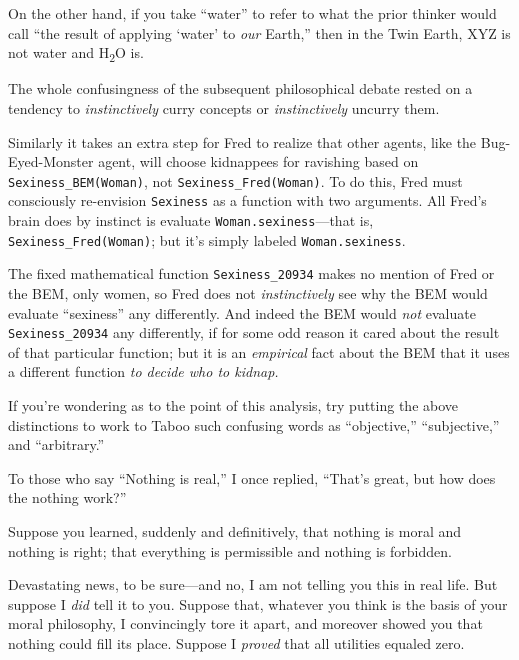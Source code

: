 {
 On the other hand, if you take
``water'' to refer to what the prior
thinker would call ``the result of applying
`water' to \textit{our}
Earth,'' then in the Twin Earth, XYZ is not water and
H\textsubscript{2}O is.}

{
 The whole confusingness of the subsequent philosophical debate
rested on a tendency to \textit{instinctively} curry concepts or
\textit{instinctively} uncurry them.}

{
 Similarly it takes an extra step for Fred to realize that other
agents, like the Bug-Eyed-Monster agent, will choose kidnappees for
ravishing based on \texttt{Sexiness\_BEM(Woman)}, not \texttt{Sexiness\_Fred(Woman)}. To
do this, Fred must consciously re-envision \texttt{Sexiness} as a function with
two arguments. All Fred's brain does by instinct is
evaluate \texttt{Woman.sexiness}---that is, \texttt{Sexiness\_Fred(Woman)}; but
it's simply labeled \texttt{Woman.sexiness}.}

{
 The fixed mathematical function \texttt{Sexiness\_20934} makes no mention
of Fred or the BEM, only women, so Fred does not \textit{instinctively}
see why the BEM would evaluate
``sexiness'' any differently. And
indeed the BEM would \textit{not} evaluate \texttt{Sexiness\_20934} any
differently, if for some odd reason it cared about the result of that
particular function; but it is an \textit{empirical} fact about the BEM
that it uses a different function \textit{to decide who to kidnap.}}

{
 If you're wondering as to the point of this
analysis, try putting the above distinctions to work to Taboo such
confusing words as ``objective,''
``subjective,'' and
``arbitrary.''}

\myendsectiontext


{
 To those who say ``Nothing is
real,'' I once replied,
``That's great, but how does the
nothing work?'' }

{
 Suppose you learned, suddenly and definitively, that nothing is
moral and nothing is right; that everything is permissible and nothing
is forbidden.}

{
 Devastating news, to be sure---and no, I am not telling you this
in real life. But suppose I \textit{did} tell it to you. Suppose that,
whatever you think is the basis of your moral philosophy, I
convincingly tore it apart, and moreover showed you that nothing could
fill its place. Suppose I \textit{proved} that all utilities equaled
zero.}


